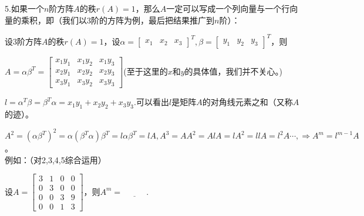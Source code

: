 \documentclass{article}
\begin{document}
5.如果一个$n$阶方阵$A$的秩$r(A)=1$，那么$A$一定可以写成一个列向量与一个行向量的乘积，即（我们以3阶的方阵为例，最后把结果推广到$n$阶）：

设$3$阶方阵$A$的秩$r(A)=1$，设$\alpha=\begin{bmatrix}
          x_{1} & x_{2} & x_{3}
        \end{bmatrix}^{T},\beta=\begin{bmatrix}
          y_{1} & y_{2} & y_{3}
        \end{bmatrix}^{T}$，则

        $A=\alpha\beta^T=\begin{bmatrix}
          x_{1}y_{1} & x_{1}y_{2} & x_{1}y_{3}\\
          x_{2}y_{1} & x_{2}y_{2} & x_{2}y_{3}\\
          x_{3}y_{1} & x_{3}y_{2} & x_{3}y_{3}
        \end{bmatrix}$(至于这里的$x$和$y$的具体值，我们并不关心。)

        $l=\alpha^T\beta=\beta^T\alpha=x_{1}y_{1}+x_{2}y_{2}+x_{3}y_{3}$.可以看出$l$是矩阵$A$的对角线元素之和（又称$A$的迹）。

        $A^2=(\alpha\beta^T)^2=\alpha(\beta^T\alpha)\beta^T=l\alpha\beta^T=lA,A^3=AA^2=AlA=lA^2=llA=l^2A\cdots, \Rightarrow A^m=l^{m-1}A$。\\


例如：（对2,3,4,5综合运用）

设$A=
  \begin{bmatrix}
 3&1&0&0\\
 0&3&0&0\\
 0&0&3&9\\
 0&0&1&3
  \end{bmatrix}
  $，则$A^{m}=\underline{~~~~~~~~~~~~~}.$
\end{document}
